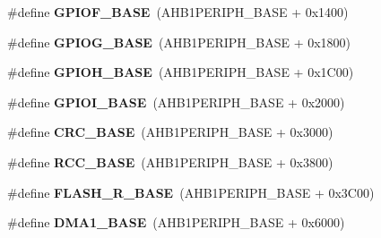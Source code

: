 \begin{DoxyCompactItemize}
\item 
\hypertarget{group___peripheral__memory__map_ga7f9a3f4223a1a784af464a114978d26e}{\#define {\bfseries G\-P\-I\-O\-F\-\_\-\-B\-A\-S\-E}~(A\-H\-B1\-P\-E\-R\-I\-P\-H\-\_\-\-B\-A\-S\-E + 0x1400)}\label{group___peripheral__memory__map_ga7f9a3f4223a1a784af464a114978d26e}

\item 
\hypertarget{group___peripheral__memory__map_ga5d8ca4020f2e8c00bde974e8e7c13cfe}{\#define {\bfseries G\-P\-I\-O\-G\-\_\-\-B\-A\-S\-E}~(A\-H\-B1\-P\-E\-R\-I\-P\-H\-\_\-\-B\-A\-S\-E + 0x1800)}\label{group___peripheral__memory__map_ga5d8ca4020f2e8c00bde974e8e7c13cfe}

\item 
\hypertarget{group___peripheral__memory__map_gaee4716389f3a1c727495375b76645608}{\#define {\bfseries G\-P\-I\-O\-H\-\_\-\-B\-A\-S\-E}~(A\-H\-B1\-P\-E\-R\-I\-P\-H\-\_\-\-B\-A\-S\-E + 0x1\-C00)}\label{group___peripheral__memory__map_gaee4716389f3a1c727495375b76645608}

\item 
\hypertarget{group___peripheral__memory__map_ga50acf918c2e1c4597d5ccfe25eb3ad3d}{\#define {\bfseries G\-P\-I\-O\-I\-\_\-\-B\-A\-S\-E}~(A\-H\-B1\-P\-E\-R\-I\-P\-H\-\_\-\-B\-A\-S\-E + 0x2000)}\label{group___peripheral__memory__map_ga50acf918c2e1c4597d5ccfe25eb3ad3d}

\item 
\hypertarget{group___peripheral__memory__map_ga656a447589e785594cbf2f45c835ad7e}{\#define {\bfseries C\-R\-C\-\_\-\-B\-A\-S\-E}~(A\-H\-B1\-P\-E\-R\-I\-P\-H\-\_\-\-B\-A\-S\-E + 0x3000)}\label{group___peripheral__memory__map_ga656a447589e785594cbf2f45c835ad7e}

\item 
\hypertarget{group___peripheral__memory__map_ga0e681b03f364532055d88f63fec0d99d}{\#define {\bfseries R\-C\-C\-\_\-\-B\-A\-S\-E}~(A\-H\-B1\-P\-E\-R\-I\-P\-H\-\_\-\-B\-A\-S\-E + 0x3800)}\label{group___peripheral__memory__map_ga0e681b03f364532055d88f63fec0d99d}

\item 
\hypertarget{group___peripheral__memory__map_ga8e21f4845015730c5731763169ec0e9b}{\#define {\bfseries F\-L\-A\-S\-H\-\_\-\-R\-\_\-\-B\-A\-S\-E}~(A\-H\-B1\-P\-E\-R\-I\-P\-H\-\_\-\-B\-A\-S\-E + 0x3\-C00)}\label{group___peripheral__memory__map_ga8e21f4845015730c5731763169ec0e9b}

\item 
\hypertarget{group___peripheral__memory__map_gab2d8a917a0e4ea99a22ac6ebf279bc72}{\#define {\bfseries D\-M\-A1\-\_\-\-B\-A\-S\-E}~(A\-H\-B1\-P\-E\-R\-I\-P\-H\-\_\-\-B\-A\-S\-E + 0x6000)}\label{group___peripheral__memory__map_gab2d8a917a0e4ea99a22ac6ebf279bc72}


\end{DoxyCompactItemize}
